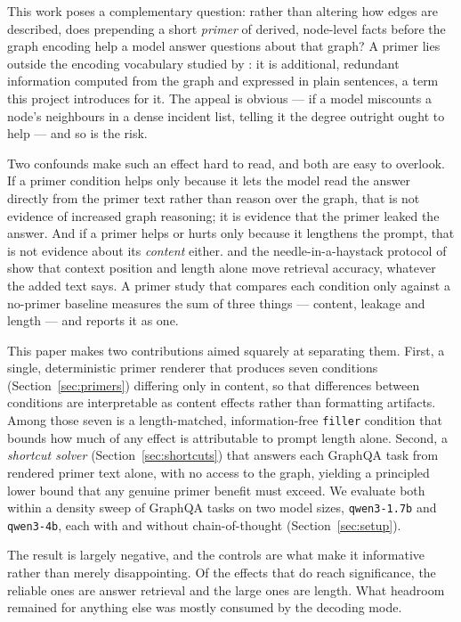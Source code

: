 \documentclass[11pt]{article}
\begin{document}
This work poses a complementary question: rather than altering how edges
are described, does prepending a short \emph{primer} of derived,
node-level facts before the graph encoding help a model answer questions
about that graph? A primer lies outside the encoding vocabulary studied by
\citet{fatemi2023talklikeagraph}: it is additional, redundant information
computed from the graph and expressed in plain sentences, a term this
project introduces for it. The appeal is obvious --- if a model miscounts a
node's neighbours in a dense incident list, telling it the degree outright
ought to help --- and so is the risk.

Two confounds make such an effect hard to read, and both are easy to
overlook. If a primer condition helps only because it lets the model read
the answer directly from the primer text rather than reason over the graph,
that is not evidence of increased graph reasoning; it is evidence that the
primer leaked the answer. And if a primer helps or hurts only because it
lengthens the prompt, that is not evidence about its \emph{content} either.
\citet{liu2024lostinthemiddle} and the needle-in-a-haystack protocol of
\citet{kamradt2023needle} show that context position and length alone move
retrieval accuracy, whatever the added text says. A primer study that
compares each condition only against a no-primer baseline measures the sum
of three things --- content, leakage and length --- and reports it as one.

This paper makes two contributions aimed squarely at separating them.
First, a single, deterministic primer renderer that produces seven
conditions (Section~\ref{sec:primers}) differing only in content, so that
differences between conditions are interpretable as content effects rather
than formatting artifacts. Among those seven is a length-matched,
information-free \texttt{filler} condition that bounds how much of any
effect is attributable to prompt length alone. Second, a \emph{shortcut
solver} (Section~\ref{sec:shortcuts}) that answers each GraphQA task from
rendered primer text alone, with no access to the graph, yielding a
principled lower bound that any genuine primer benefit must exceed. We
evaluate both within a density sweep of GraphQA tasks on two model sizes,
\texttt{qwen3-1.7b} and \texttt{qwen3-4b}, each with and without
chain-of-thought (Section~\ref{sec:setup}).

The result is largely negative, and the controls are what make it
informative rather than merely disappointing. Of the effects that do reach
significance, the reliable ones are answer retrieval and the large ones are
length. What headroom remained for anything else was mostly consumed by the
decoding mode.
\end{document}
